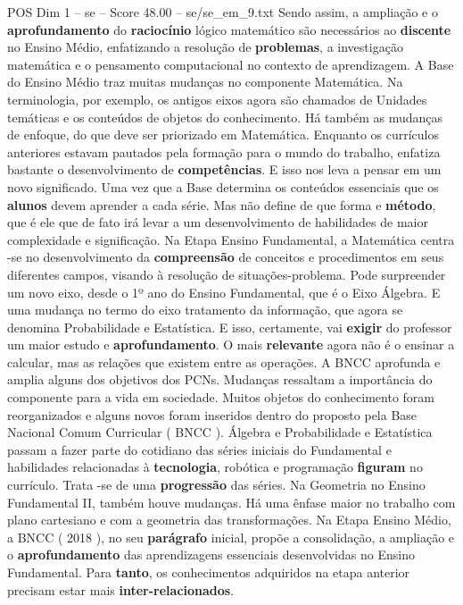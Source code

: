 \begin{textsample}{POS Dim 1 – se – Score 48.00 – se/se\_em\_9.txt}
Sendo assim, a ampliação e o \textbf{aprofundamento} do \textbf{raciocínio} lógico matemático são necessários ao \textbf{discente} no Ensino Médio, enfatizando a resolução de \textbf{problemas}, a investigação matemática e o pensamento computacional no contexto de aprendizagem.
A Base do Ensino Médio traz muitas mudanças no componente Matemática.
Na terminologia, por exemplo, os antigos eixos agora são chamados de Unidades temáticas e os conteúdos de objetos do conhecimento.
Há também as mudanças de enfoque, do que deve ser priorizado em Matemática.
Enquanto os currículos anteriores estavam pautados pela formação para o mundo do trabalho, enfatiza bastante o desenvolvimento de \textbf{competências}.
E isso nos leva a pensar em um novo significado.
Uma vez que a Base determina os conteúdos essenciais que os \textbf{alunos} devem aprender a cada série.
Mas não define de que forma e \textbf{método}, que é ele que de fato irá levar a um desenvolvimento de habilidades de maior complexidade e significação.
Na Etapa Ensino Fundamental, a Matemática centra -se no desenvolvimento da \textbf{compreensão} de conceitos e procedimentos em seus diferentes campos, visando à resolução de situações-problema.
Pode surpreender um novo eixo, desde o 1º ano do Ensino Fundamental, que é o Eixo Álgebra.
E uma mudança no termo do eixo tratamento da informação, que agora se denomina Probabilidade e Estatística.
E isso, certamente, vai \textbf{exigir} do professor um maior estudo e \textbf{aprofundamento}.
O mais \textbf{relevante} agora não é o ensinar a calcular, mas as relações que existem entre as operações.
A BNCC aprofunda e amplia alguns dos objetivos dos PCNs.
Mudanças ressaltam a importância do componente para a vida em sociedade.
Muitos objetos do conhecimento foram reorganizados e alguns novos foram inseridos dentro do proposto pela Base Nacional Comum Curricular ( BNCC ).
Álgebra e Probabilidade e Estatística passam a fazer parte do cotidiano das séries iniciais do Fundamental e habilidades relacionadas à \textbf{tecnologia}, robótica e programação \textbf{figuram} no currículo.
Trata -se de uma \textbf{progressão} das séries.
Na Geometria no Ensino Fundamental II, também houve mudanças.
Há uma ênfase maior no trabalho com plano cartesiano e com a geometria das transformações.
Na Etapa Ensino Médio, a BNCC ( 2018 ), no seu \textbf{parágrafo} inicial, propõe a consolidação, a ampliação e o \textbf{aprofundamento} das aprendizagens essenciais desenvolvidas no Ensino Fundamental.
Para \textbf{tanto}, os conhecimentos adquiridos na etapa anterior precisam estar mais \textbf{inter-relacionados}.

\end{textsample}
